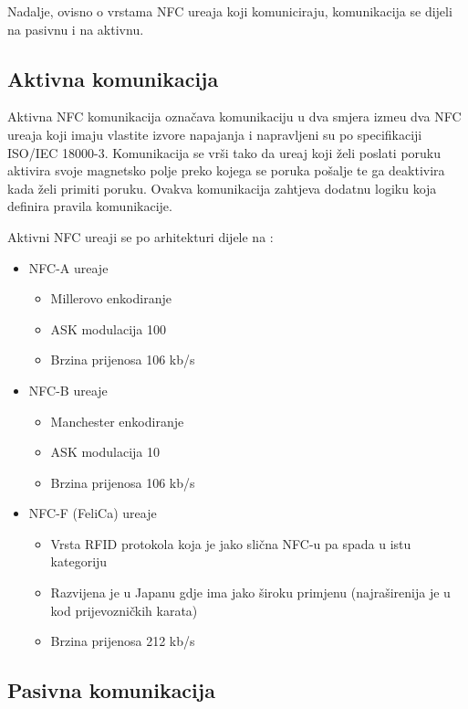 Nadalje, ovisno o vrstama NFC ure\dj aja koji komuniciraju, komunikacija se dijeli na pasivnu i na aktivnu.


\subsection{Aktivna komunikacija}

Aktivna NFC komunikacija ozna\v{c}ava komunikaciju u dva smjera izme\dj u dva NFC ure\dj aja koji imaju vlastite izvore napajanja i napravljeni su po specifikaciji ISO/IEC 18000-3. Komunikacija se vr\v{s}i tako da ure\dj aj koji \v{z}eli poslati poruku aktivira svoje magnetsko polje preko kojega se poruka po\v{s}alje te ga deaktivira kada \v{z}eli primiti poruku. Ovakva komunikacija zahtjeva dodatnu logiku koja definira pravila komunikacije.

Aktivni NFC ure\dj aji se po arhitekturi dijele na \cite{nfc_types}:

\begin{itemize}
	\item NFC-A ure\dj aje
	\begin{itemize}
		\item Millerovo enkodiranje
		\item ASK modulacija 100%
		\item Brzina prijenosa 106 kb/s
	\end{itemize}

	\item NFC-B ure\dj aje
	\begin{itemize}
		\item Manchester enkodiranje
		\item ASK modulacija 10%
		\item Brzina prijenosa 106 kb/s
	\end{itemize}

	\item NFC-F (FeliCa) ure\dj aje
	\begin{itemize}
		\item Vrsta RFID protokola koja je jako sli\v{c}na NFC-u pa spada u istu kategoriju
		\item Razvijena je u Japanu gdje ima jako \v{s}iroku primjenu (najra\v{s}irenija je u kod prijevozni\v{c}kih karata)
		\item  Brzina prijenosa 212 kb/s
	\end{itemize}
\end{itemize}


\subsection{Pasivna komunikacija}

